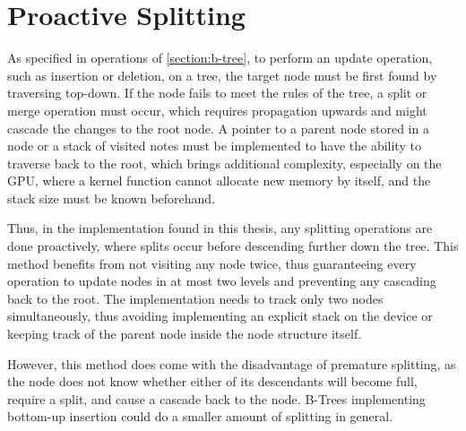 \section{Proactive Splitting}

As specified in operations of \cref{section:b-tree}, to perform an update operation, such as insertion or deletion, on a tree, the target node must be first found by traversing top-down. If the node fails to meet the rules  of the tree, a split or merge operation must occur, which requires propagation upwards and might cascade the changes to the root node. A pointer to a parent node stored in a node or a stack of visited notes must be implemented to have the ability to traverse back to the root, which brings additional complexity, especially on the GPU, where a kernel function cannot allocate new memory by itself, and the stack size must be known beforehand.

Thus, in the implementation found in this thesis, any splitting operations are done proactively, where splits occur before descending further down the tree. This method benefits from not visiting any node twice, thus guaranteeing every operation to update nodes in at most two levels and preventing any cascading back to the root. The implementation needs to track only two nodes simultaneously, thus avoiding implementing an explicit stack on the device or keeping track of the parent node inside the node structure itself.

However, this method does come with the disadvantage of premature splitting, as the node does not know whether either of its descendants will become full, require a split, and cause a cascade back to the node. B-Trees implementing bottom-up insertion could do a smaller amount of splitting in general.
 